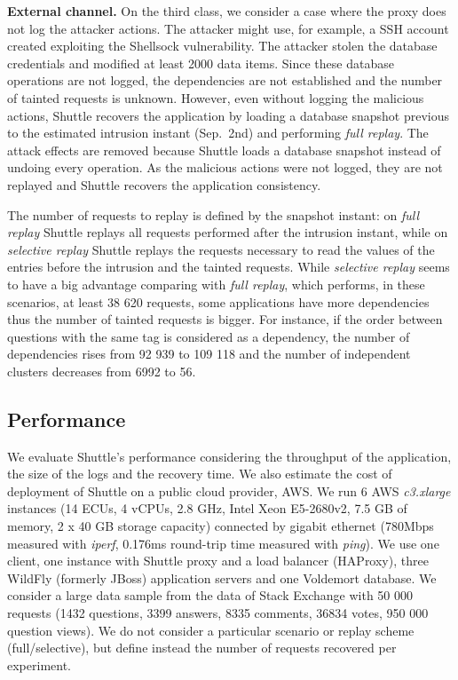 \documentclass[10pt,conference]{IEEEtran}
\begin{document}
\textbf{External channel.}
On the third class, we consider a case where the proxy does not log the attacker actions. The attacker might use, for example, a SSH account created exploiting the Shellsock vulnerability. The attacker stolen the database credentials and modified at least 2000 data items. Since these database operations are not logged, the dependencies are not established and the number of tainted requests is unknown. However, even without logging the malicious actions, Shuttle recovers the application by loading a database snapshot previous to the estimated intrusion instant (Sep.~2nd) and performing \textit{full replay}. The attack effects are removed because Shuttle loads a database snapshot instead of undoing every operation. As the malicious actions were not logged, they are not replayed and Shuttle recovers the application consistency.


The number of requests to replay is defined by the snapshot instant: on \textit{full replay} Shuttle replays all requests performed after the intrusion instant, while on \textit{selective replay} Shuttle replays the requests necessary to read the values of the entries before the intrusion and the tainted requests. While  \textit{selective replay} seems to have a big advantage comparing with  \textit{full replay}, which performs, in these scenarios, at least 38 620 requests, some applications have more dependencies thus the number of tainted requests is bigger. For instance, if the order between questions with the same tag is considered as a dependency, the number of dependencies rises from 92 939 to 109 118 and the number of independent clusters decreases from 6992 to 56. 


\subsection{Performance}
\label{sec:evaluation:performance}

We evaluate Shuttle's performance considering the throughput of the application, the size of the logs and the recovery time. We also estimate the cost of deployment of Shuttle on a public cloud provider, \acf{AWS}. We run 6 \ac{AWS} \textit{c3.xlarge} instances (14 ECUs, 4 vCPUs, 2.8 GHz, Intel Xeon E5-2680v2, 7.5 GB of memory, 2 x 40 GB storage capacity) connected by gigabit ethernet (780Mbps measured with \emph{iperf}, 0.176ms round-trip time measured with \emph{ping}). We use one client, one instance with Shuttle proxy and a load balancer (HAProxy), three WildFly (formerly JBoss) application servers and one Voldemort database. We consider a large data sample from the data of Stack Exchange with 50 000 requests (1432 questions, 3399 answers, 8335 comments, 36834 votes, 950 000 question views). We do not consider a particular scenario or replay scheme (full/selective), but define instead the number of requests recovered per experiment.
\end{document}
